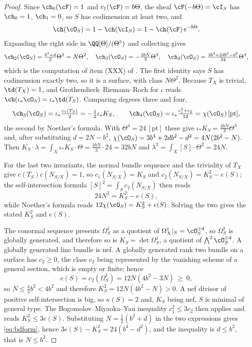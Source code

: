 \begin{proof}
Since $\ch_{0}(\cF)=1$ and $c_{1}(\cF)=b\Theta$, the sheaf
$\cF(-b\Theta)=\cI_{S}$ has $\ch_{0}=1$, $\ch_{1}=0$, so $S$ has codimension
at least two, and
\[
  \ch(\cO_{S})=1-\ch(\cI_{S})=1-\ch(\cF)\,e^{-b\Theta}.
\]
Expanding the right side in $\QQ[\Theta]/(\Theta^{5})$ and collecting gives
\[
  \ch_{2}(\cO_{S})=\tfrac{b^{2}+d}{2}\Theta^{2}=N\Theta^{2},\quad
  \ch_{3}(\cO_{S})=-\tfrac{2bN}{3}\Theta^{3},\quad
  \ch_{4}(\cO_{S})=\tfrac{3b^{4}+2db^{2}-d^{2}}{24}\Theta^{4},
\]
which is the computation of item (XXX) of . The first
identity says $S$ has codimension exactly two, so it is a surface, with class
$N\Theta^{2}$. Because $T_{X}$ is trivial, $\td(T_{X})=1$, and
Grothendieck--Riemann--Roch for $\iota$ reads
$\ch(\iota_{*}\cO_{S})=\iota_{*}\td(T_{S})$. Comparing degrees three and four,
\[
  \ch_{3}(\cO_{S})=\iota_{*}\tfrac{c_{1}(T_{S})}{2}=-\tfrac12\iota_{*}K_{S},
  \qquad
  \ch_{4}(\cO_{S})=\iota_{*}\tfrac{c_{1}^{2}+c_{2}}{12}
  =\chi(\cO_{S})\,[\mathrm{pt}],
\]
the second by Noether's formula. With $\Theta^{4}=24\,[\mathrm{pt}]$ these give
$\iota_{*}K_{S}=\tfrac{4bN}{3}\Theta^{3}$ and, after substituting
$d=2N-b^{2}$, $\chi(\cO_{S})=3b^{4}+2db^{2}-d^{2}=4N(2b^{2}-N)$.
Then $K_{S}\cdot\lambda=\int_{X}\iota_{*}K_{S}\cdot\Theta=\tfrac{4bN}{3}\cdot24=32bN$
and $\lambda^{2}=\int_{X}[S]\cdot\Theta^{2}=24N$.

For the last two invariants, the normal bundle sequence and the triviality of
$T_{X}$ give $c(T_{S})c(N_{S/X})=1$, so $c_{1}(N_{S/X})=K_{S}$ and
$c_{2}(N_{S/X})=K_{S}^{2}-e(S)$; the self-intersection formula
$[S]^{2}=\int_{S}c_{2}(N_{S/X})$ then reads
\[
  24N^{2}=K_{S}^{2}-e(S),
\]
while Noether's formula reads $12\chi(\cO_{S})=K_{S}^{2}+e(S)$. Solving the
two gives the stated $K_{S}^{2}$ and $e(S)$.

The conormal sequence presents $\Omega^{1}_{S}$ as a quotient of
$\Omega^{1}_{X}|_{S}=\cO_{S}^{\oplus4}$, so $\Omega^{1}_{S}$ is globally
generated, and therefore so is $K_{S}=\det\Omega^{1}_{S}$, a quotient of
$\bigwedge^{2}\cO_{S}^{\oplus4}$. A globally generated line bundle is nef. A
globally generated rank two bundle on a surface has $c_{2}\ge0$, the class
$c_{2}$ being represented by the vanishing scheme of a general section, which
is empty or finite; hence
\[
  e(S)=c_{2}(\Omega^{1}_{S})=12N(4b^{2}-3N)\ \ge\ 0,
\]
so $N\le\tfrac43b^{2}<4b^{2}$ and therefore $K_{S}^{2}=12N(4b^{2}-N)>0$. A nef
divisor of positive self-intersection is big, so $\kappa(S)=2$ and, $K_{S}$
being nef, $S$ is minimal of general type. The Bogomolov--Miyaoka--Yau
inequality $c_{1}^{2}\le3c_{2}$ then applies and reads
$K_{S}^{2}\le3e(S)$. Substituting $N=\tfrac12(b^{2}+d)$ in the two
expressions gives \eqref{eq:bdform}, hence
$3e(S)-K_{S}^{2}=24(b^{4}-d^{2})$, and the inequality is $d\le b^{2}$, that
is $N\le b^{2}$.


\end{proof}
